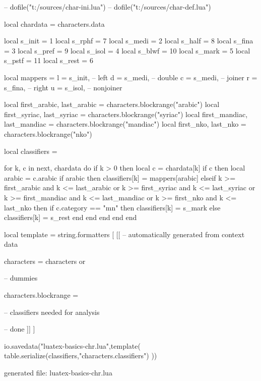 

\startluacode

-- dofile("t:/sources/char-ini.lua")
-- dofile("t:/sources/char-def.lua")

local chardata   = characters.data

local s_init = 1    local s_rphf =  7
local s_medi = 2    local s_half =  8
local s_fina = 3    local s_pref =  9
local s_isol = 4    local s_blwf = 10
local s_mark = 5    local s_pstf = 11
local s_rest = 6

local mappers = {
    l = s_init,  -- left
    d = s_medi,  -- double
    c = s_medi,  -- joiner
    r = s_fina,  -- right
    u = s_isol,  -- nonjoiner
}

local first_arabic,  last_arabic  = characters.blockrange("arabic")
local first_syriac,  last_syriac  = characters.blockrange("syriac")
local first_mandiac, last_mandiac = characters.blockrange("mandiac")
local first_nko,     last_nko     = characters.blockrange("nko")

local classifiers = { }

for k, c in next, chardata do
    if k > 0 then
        local c = chardata[k]
        if c then
            local arabic = c.arabic
            if arabic then
                classifiers[k] = mappers[arabic]
            elseif k >= first_arabic  and k <= last_arabic  or k >= first_syriac  and k <= last_syriac  or
                   k >= first_mandiac and k <= last_mandiac or k >= first_nko     and k <= last_nko     then
                if c.category == "mn" then
                    classifiers[k] = s_mark
                else
                    classifiers[k] = s_rest
                end
            end
        end
    end
end

local template = string.formatters [ [[
-- automatically generated from context data

characters = characters or { }

-- dummies

characters.blockrange = { }

-- classifiers needed for analysis


-- done
]] ]

io.savedata("luatex-basics-chr.lua",template(
    table.serialize(classifiers,"characters.classifiers")
))

\stopluacode

\startTEXpage[offset=10pt]
    \tttf generated file: luatex-basics-chr.lua
\stopTEXpage
